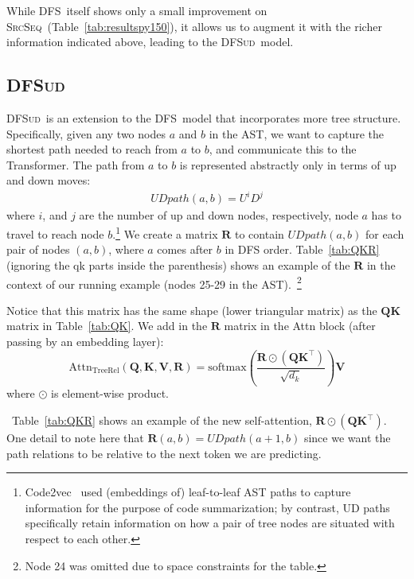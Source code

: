 \documentclass[nonacm, sigconf]{acmart}
\newcommand{\mat}[1]{\boldsymbol{#1}}
\newcommand{\softmax}{\text{softmax}}
\newcommand{\AttnTreeRel}{\text{Attn}_\text{TreeRel}}
\newcommand{\abbr}[1]{\textsc{#1}~}
\newcommand{\SrcSeq}{\abbr{SrcSeq}} \newcommand{\SrcRNN}{\abbr{SrcRNN}} \newcommand{\LeafSeq}{\abbr{LeafSeq}} \newcommand{\RootPath}{\abbr{RootPath}} \newcommand{\LeafTokens}{\abbr{LeafTokens}} \newcommand{\DFS}{\abbr{DFS}} \newcommand{\TreeRel}{\abbr{DFS{ud}}} \newcommand{\TreeReli}{\abbr{DFS{ud+}}}
\newcommand{\tabref}[1]{Table~\ref{#1}}
\begin{document}
While \DFS itself shows only a small improvement on \SrcSeq (Table~\ref{tab:resultspy150}), it allows us to augment it with the richer information indicated above, leading to the \TreeRel model.



\subsection{\TreeRel}
\label{sec:dfsud}

\TreeRel is an extension to the \DFS model that incorporates more tree structure.  Specifically, given any two nodes $a$ and $b$ in the AST, we want to capture the shortest path needed to reach from $a$ to $b$, and communicate this to the Transformer.  The
path from $a$ to $b$ is represented abstractly only in terms of up and down moves:
\begin{align*}
   \mathit{UDpath}(a, b) = U^i D^j
\end{align*}
where $i$, and $j$ are the number of up and down nodes, respectively, node $a$ has to travel to reach node $b$.\footnote{Code2vec~\citep{alon2019code2vec} used (embeddings of) leaf-to-leaf AST paths to capture information for the purpose of code summarization; by contrast, UD paths specifically retain information on how a pair of tree nodes are situated with respect to each other.
}  
We create a matrix $\mat{R}$ to contain $\mathit{UDpath}(a, b)$ for each pair of nodes $(a,b)$, where $a$ comes after $b$ in DFS order. \tabref{tab:QKR} (ignoring the qk parts inside the parenthesis) shows an example of the $\mat{R}$ in the context of our running example (nodes 25-29 in the AST).~\footnote{Node 24 was omitted due to space constraints for the table.} 

Notice that this matrix has the same shape (lower triangular matrix) as the $\mat{Q}\mat{K}$ matrix in \tabref{tab:QK}.  We add in the $\mat{R}$ matrix in the Attn block (after passing by an embedding layer): 
\begin{equation}
  \AttnTreeRel(\mat{Q},\mat{K},\mat{V},\mat{R}) = \softmax(\frac{\mat{R} \odot (\mat{Q} \mat{K}^\top)}{\sqrt{d_k}}) \mat{V}
\end{equation}
where $\odot$ is element-wise product. 

~\tabref{tab:QKR} shows an example of the new self-attention, $\mat{R} \odot (\mat{Q} \mat{K}^\top).$  One detail to note here that $\mat{R}(a, b) = \mathit{UDpath}(a + 1, b)$ since we want the path relations to be relative to the next token we are predicting.
\end{document}

